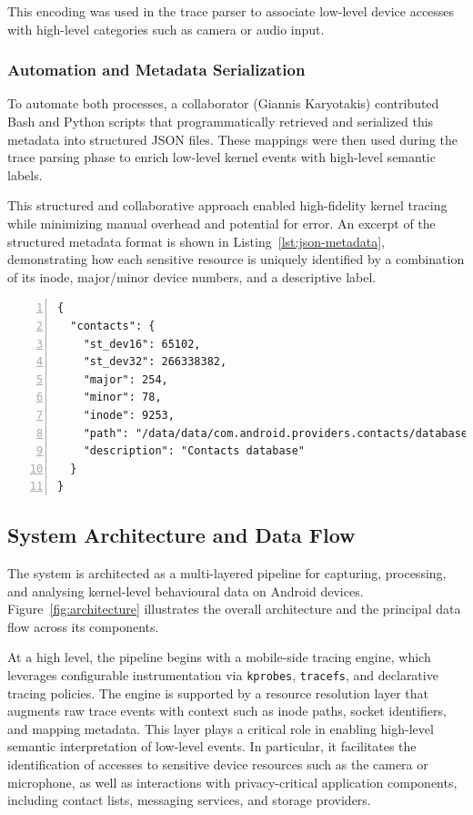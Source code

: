 \documentclass[a4paper,12pt]{report}
\begin{document}
This encoding was used in the trace parser to associate low-level device accesses with high-level categories such as camera or audio input.

\subsubsection{Automation and Metadata Serialization}

To automate both processes, a collaborator (Giannis Karyotakis) contributed Bash and Python scripts that programmatically retrieved and serialized this metadata into structured JSON files. These mappings were then used during the trace parsing phase to enrich low-level kernel events with high-level semantic labels.

This structured and collaborative approach enabled high-fidelity kernel tracing while minimizing manual overhead and potential for error.
An excerpt of the structured metadata format is shown in Listing~\ref{lst:json-metadata}, demonstrating how each sensitive resource is uniquely identified by a combination of its inode, major/minor device numbers, and a descriptive label.

\begin{lstlisting}[caption={Serialized JSON metadata for sensitive resource mapping},label={lst:json-metadata},numbers=left]
{
  "contacts": {
    "st_dev16": 65102,
    "st_dev32": 266338382,
    "major": 254,
    "minor": 78,
    "inode": 9253,
    "path": "/data/data/com.android.providers.contacts/databases/contacts2.db",
    "description": "Contacts database"
  }
}
\end{lstlisting}

\subsection{System Architecture and Data Flow}

The system is architected as a multi-layered pipeline for capturing, processing, and analysing kernel-level behavioural data on Android devices. Figure~\ref{fig:architecture} illustrates the overall architecture and the principal data flow across its components.

At a high level, the pipeline begins with a mobile-side tracing engine, which leverages configurable instrumentation via \texttt{kprobes}, \texttt{tracefs}, and declarative tracing policies. The engine is supported by a resource resolution layer that augments raw trace events with context such as inode paths, socket identifiers, and mapping metadata. This layer plays a critical role in enabling high-level semantic interpretation of low-level events. In particular, it facilitates the identification of accesses to sensitive device resources such as the camera or microphone, as well as interactions with privacy-critical application components, including contact lists, messaging services, and storage providers.
\end{document}
